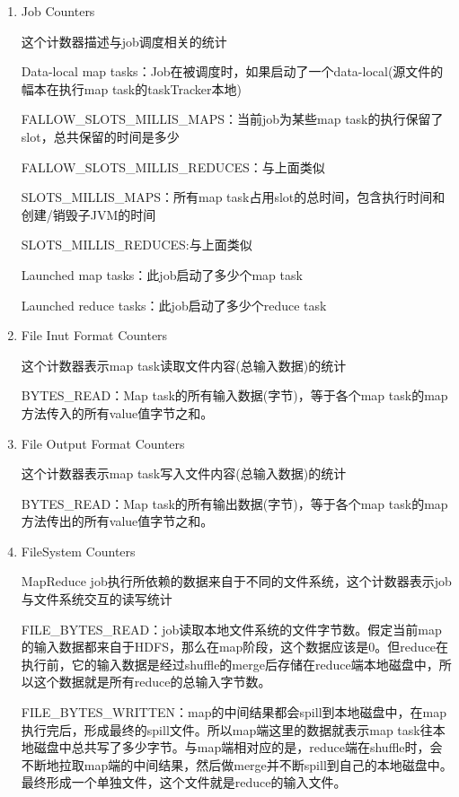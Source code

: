 \begin{enumerate}

\item Job Counters 

这个计数器描述与job调度相关的统计 

Data-local map tasks：Job在被调度时，如果启动了一个data-local(源文件的幅本在执行map task的taskTracker本地) 

FALLOW\_SLOTS\_MILLIS\_MAPS：当前job为某些map task的执行保留了slot，总共保留的时间是多少 

FALLOW\_SLOTS\_MILLIS\_REDUCES：与上面类似 

SLOTS\_MILLIS\_MAPS：所有map task占用slot的总时间，包含执行时间和创建/销毁子JVM的时间 

SLOTS\_MILLIS\_REDUCES:与上面类似 

Launched map tasks：此job启动了多少个map task 

Launched reduce tasks：此job启动了多少个reduce task 


\item File Inut Format Counters

这个计数器表示map task读取文件内容(总输入数据)的统计

BYTES\_READ：Map task的所有输入数据(字节)，等于各个map task的map方法传入的所有value值字节之和。 

\item File Output Format Counters

这个计数器表示map task写入文件内容(总输入数据)的统计

BYTES\_READ：Map task的所有输出数据(字节)，等于各个map task的map方法传出的所有value值字节之和。 

\item FileSystem Counters

MapReduce job执行所依赖的数据来自于不同的文件系统，这个计数器表示job与文件系统交互的读写统计 

FILE\_BYTES\_READ：job读取本地文件系统的文件字节数。假定当前map的输入数据都来自于HDFS，那么在map阶段，这个数据应该是0。但reduce在执行前，它的输入数据是经过shuffle的merge后存储在reduce端本地磁盘中，所以这个数据就是所有reduce的总输入字节数。 

FILE\_BYTES\_WRITTEN：map的中间结果都会spill到本地磁盘中，在map执行完后，形成最终的spill文件。所以map端这里的数据就表示map task往本地磁盘中总共写了多少字节。与map端相对应的是，reduce端在shuffle时，会不断地拉取map端的中间结果，然后做merge并不断spill到自己的本地磁盘中。最终形成一个单独文件，这个文件就是reduce的输入文件。 


\end{enumerate}
